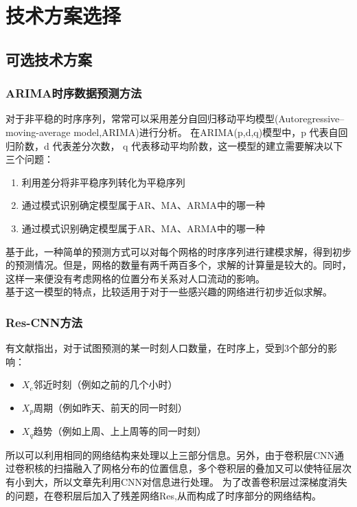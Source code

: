 \section{技术方案选择}
\subsection{可选技术方案}
\subsubsection*{ARIMA时序数据预测方法}
\label{arima}
对于非平稳的时序序列，常常可以采用差分自回归移动平均模型(Autoregressive–moving-average model,ARIMA)进行分析\cite{whittle1966prediction,Hannan1970Multiple}。
在ARIMA(p,d,q)模型中，p 代表自回归阶数，d 代表差分次数， q 代表移动平均阶数，这一模型的建立需要解决以下三个问题：
\begin{enumerate}
	\item 利用差分将非平稳序列转化为平稳序列
	\item 通过模式识别确定模型属于AR、MA、ARMA中的哪一种
	\item 通过模式识别确定模型属于AR、MA、ARMA中的哪一种
\end{enumerate}
\indent 基于此，一种简单的预测方式可以对每个网格的时序序列进行建模求解，得到初步的预测情况。但是，网格的数量有两千两百多个，求解的计算量是较大的。同时，这样一来便没有考虑网格的位置分布关系对人口流动的影响。\\
\indent 基于这一模型的特点，比较适用于对于一些感兴趣的网络进行初步近似求解。
\subsubsection*{Res-CNN方法}
有文献\cite{Zhang2016Deep}指出，对于试图预测的某一时刻人口数量，在时序上，受到3个部分的影响：
\begin{itemize}
	\item $X_c$邻近时刻（例如之前的几个小时）
	\item $X_p$周期（例如昨天、前天的同一时刻）
	\item $X_q$趋势（例如上周、上上周等的同一时刻）
\end{itemize}
所以可以利用相同的网络结构来处理以上三部分信息。另外，由于卷积层CNN通过卷积核的扫描融入了网格分布的位置信息，多个卷积层的叠加又可以使特征层次有小到大，所以文章先利用CNN对信息进行处理。
为了改善卷积层过深梯度消失的问题，在卷积层后加入了残差网络Res,从而构成了时序部分的网络结构。

